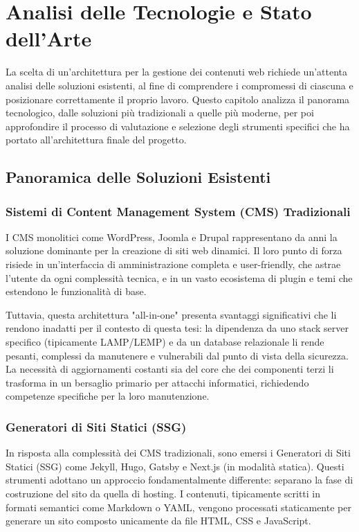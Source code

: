 \chapter{Analisi delle Tecnologie e Stato dell'Arte}
\label{chap:stato_arte}

La scelta di un'architettura per la gestione dei contenuti web richiede un'attenta analisi delle soluzioni esistenti, al fine di comprendere i compromessi di ciascuna e posizionare correttamente il proprio lavoro. Questo capitolo analizza il panorama tecnologico, dalle soluzioni più tradizionali a quelle più moderne, per poi approfondire il processo di valutazione e selezione degli strumenti specifici che ha portato all'architettura finale del progetto.

\section{Panoramica delle Soluzioni Esistenti}

\subsection{Sistemi di Content Management System (CMS) Tradizionali}
I CMS monolitici come WordPress, Joomla e Drupal rappresentano da anni la soluzione dominante per la creazione di siti web dinamici. Il loro punto di forza risiede in un'interfaccia di amministrazione completa e user-friendly, che astrae l'utente da ogni complessità tecnica, e in un vasto ecosistema di plugin e temi che estendono le funzionalità di base. 

Tuttavia, questa architettura "all-in-one" presenta svantaggi significativi che li rendono inadatti per il contesto di questa tesi: la dipendenza da uno stack server specifico (tipicamente LAMP/LEMP) e da un database relazionale li rende pesanti, complessi da manutenere e vulnerabili dal punto di vista della sicurezza. La necessità di aggiornamenti costanti sia del core che dei componenti terzi li trasforma in un bersaglio primario per attacchi informatici, richiedendo competenze specifiche per la loro manutenzione.

\subsection{Generatori di Siti Statici (SSG)}
In risposta alla complessità dei CMS tradizionali, sono emersi i Generatori di Siti Statici (SSG) come Jekyll, Hugo, Gatsby e Next.js (in modalità statica). Questi strumenti adottano un approccio fondamentalmente differente: separano la fase di costruzione del sito da quella di hosting. I contenuti, tipicamente scritti in formati semantici come Markdown o YAML, vengono processati staticamente per generare un sito composto unicamente da file HTML, CSS e JavaScript. 

